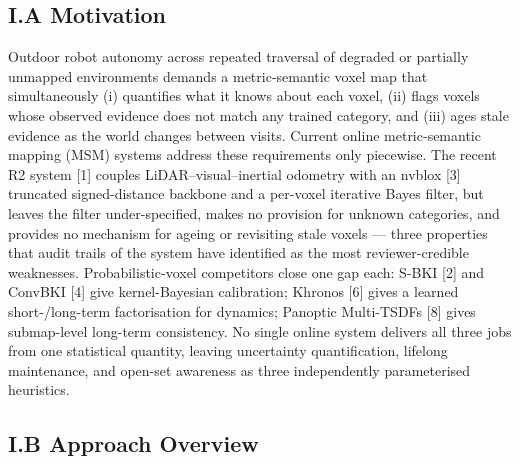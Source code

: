 \documentclass[
]{article}
\begin{document}
\subsection{I.A Motivation}\label{ia-motivation}

Outdoor robot autonomy across repeated traversal of degraded or
partially unmapped environments demands a metric-semantic voxel map that
simultaneously (i) quantifies what it knows about each voxel, (ii) flags
voxels whose observed evidence does not match any trained category, and
(iii) ages stale evidence as the world changes between visits. Current
online metric-semantic mapping (MSM) systems address these requirements
only piecewise. The recent R2 system {[}1{]} couples
LiDAR--visual--inertial odometry with an nvblox {[}3{]} truncated
signed-distance backbone and a per-voxel iterative Bayes filter, but
leaves the filter under-specified, makes no provision for unknown
categories, and provides no mechanism for ageing or revisiting stale
voxels --- three properties that audit trails of the system have
identified as the most reviewer-credible weaknesses. Probabilistic-voxel
competitors close one gap each: S-BKI {[}2{]} and ConvBKI {[}4{]} give
kernel-Bayesian calibration; Khronos {[}6{]} gives a learned
short-/long-term factorisation for dynamics; Panoptic Multi-TSDFs
{[}8{]} gives submap-level long-term consistency. No single online
system delivers all three jobs from one statistical quantity, leaving
uncertainty quantification, lifelong maintenance, and open-set awareness
as three independently parameterised heuristics.

\subsection{I.B Approach Overview}\label{ib-approach-overview}
\end{document}
